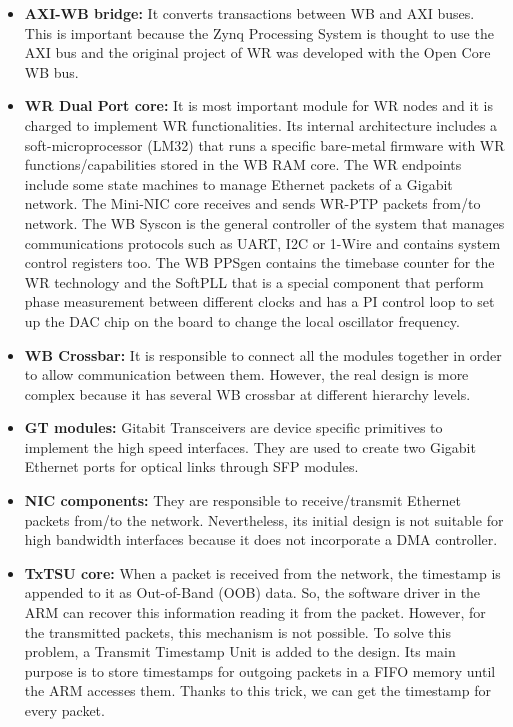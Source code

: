 \documentclass[review]{elsarticle}
\begin{document}
\begin{itemize}
	\item{\textbf{AXI-WB bridge:} It converts transactions between WB and AXI buses. This is important because the Zynq Processing System is thought to use the AXI bus and the original project of WR was developed with the Open Core WB bus. }
	\item{\textbf{WR Dual Port core:} It is most important module for WR nodes and it is charged to implement WR functionalities. Its internal architecture includes a soft-microprocessor (LM32) that runs a specific bare-metal firmware with WR functions/capabilities stored in the WB RAM core. The WR endpoints include some state machines to manage Ethernet packets of a Gigabit network. The Mini-NIC core receives and sends WR-PTP packets from/to network. The WB Syscon is the general controller of the system that manages communications protocols such as UART, I2C or 1-Wire and contains system control registers too. The WB PPSgen contains the timebase counter for the WR technology and the SoftPLL that is a special component that perform phase measurement between different clocks and has a PI control loop to set up the DAC chip on the board to change the local oscillator frequency. }
	\item{\textbf{WB Crossbar:} It is responsible to connect all the modules together in order to allow communication between them. However, the real design is more complex because it has several WB crossbar at different hierarchy levels. }
	\item{\textbf{GT modules:} Gitabit Transceivers are device specific primitives to implement the high speed interfaces. They are used to create two Gigabit Ethernet ports for optical links through SFP modules.}
	\item{\textbf{NIC components:} They are responsible to receive/transmit Ethernet packets from/to the network. Nevertheless, its initial design is not suitable for high bandwidth interfaces because it does not incorporate a DMA controller. 
	}
	\item{\textbf{TxTSU core:} When a packet is received from the network, the timestamp is appended to it as Out-of-Band (OOB) data. So, the software driver in the ARM can recover this information reading it from the packet. However, for the transmitted packets, this mechanism is not possible. To solve this problem, a Transmit Timestamp Unit is added to the design. Its main purpose is to store timestamps for outgoing packets in a FIFO memory until the ARM accesses them. Thanks to this trick, we can get the timestamp for every packet. 
		
}
\end{itemize}
\end{document}
